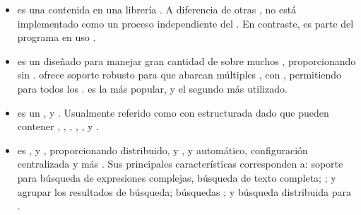 \begin{itemize}
		\item
			\textbf{\sqlite} es una \rdbms contenida en una librería \cprogramming. A diferencia de otras \dbmangesystem, \sqlite no está implementado como un proceso independiente del \clientAS. En contraste, es parte del programa en uso \cite{online_video_introduction_sqlite}.
	
		\item
			\textbf{\cassandraNAME} es un \nosqlNAME \wideColumnDB \store \openSourcePC diseñado para manejar gran cantidad de \dataPC sobre muchos \commodityServerPC, proporcionando \highAvailabilityDB sin \singlePointFailurePC. \cassandraNAME ofrece soporte robusto para \clustersAS que abarcan múltiples \dataCentersPC \cite{online_cassandra_multi_def}, con \masterlessDB \asynRepDB, permitiendo \lowLatencyOperationsINT para todos los \clientsAS. \cassandraNAME es la \wideColumnDB \store más popular, y el segundo \nosqlNAME más utilizado\cite{online_db_engines_ranking}.
	
		\item
			\textbf{\redisNAME} es un \nosqlNAME \openSourcePC, \keyValueDB \cachePC y \store. Usualmente referido como \serverAS con \dataPC estructurada dado que \keysDB pueden contener \stringsPL, \hashesPL, \listsPL, \setsPL, \sortedPL, \bitmapsPL y \hyperloglogsPL \cite{online_redis_website}.

		\item
			\textbf{\solrNAME} es \highly \reliableQA, \scalableQA y \faultTolerantQA, proporcionando \indexingDB distribuido, \replicationDB y \queryingDB \loadBalancedDB, \failoverPC y \recoveryDB automático, configuración centralizada y más \cite{online_official_website_solrn}. Sus principales características corresponden a: soporte para búsqueda de expresiones complejas, búsqueda de texto completa; \stemmingDB; \rankingCPT y agrupar los resultados de búsqueda; búsquedas \geoSpatialCPT; y búsqueda distribuida para \highScalabilityDB \cite{online_dbengines_solr_info}.
		
\end{itemize}

